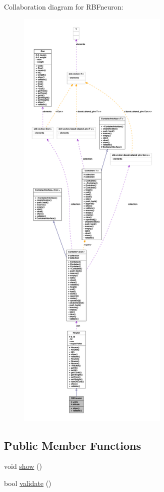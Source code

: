 Collaboration diagram for RBFneuron:
\nopagebreak
\begin{figure}[H]
\begin{center}
\leavevmode
\includegraphics[height=600pt]{class_r_b_fneuron__coll__graph}
\end{center}
\end{figure}
\subsection*{Public Member Functions}
\begin{DoxyCompactItemize}
\item 
void \hyperlink{class_r_b_fneuron_a4b17b5d1ca3c81bab496a5a3e8658510}{show} ()
\item 
bool \hyperlink{class_r_b_fneuron_af65120a27894cc6336f46e5a1e3f184b}{validate} ()
\end{DoxyCompactItemize}
